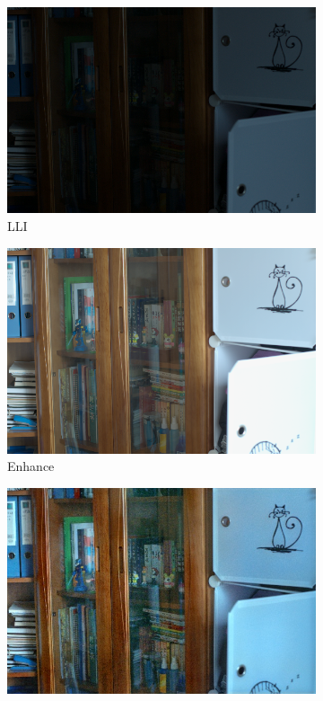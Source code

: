 \documentclass[a4paper]{ctexart}
\begin{document}
		\begin{figure}[htb]
			\centering
			\begin{subfigure}{0.19\textwidth}
				\includegraphics[width=\linewidth]{picture/LLIE/EnlightenGAN/low00001}
				\captionsetup{font=scriptsize}
				\caption{LLI}
				\label{fig: LLI}
			\end{subfigure}
			\begin{subfigure}{0.19\textwidth}
				\includegraphics[width=\linewidth]{picture/LLIE/EnlightenGAN/normal00001}
				\captionsetup{font=scriptsize}
				\caption{Enhance}
				\label{fig: Enhance}	
			\end{subfigure}
			\begin{subfigure}{0.19\textwidth}
				\includegraphics[width=\linewidth]{picture/LLIE/EnlightenGAN/processed_image}

\end{subfigure}
\end{figure}
\end{document}
